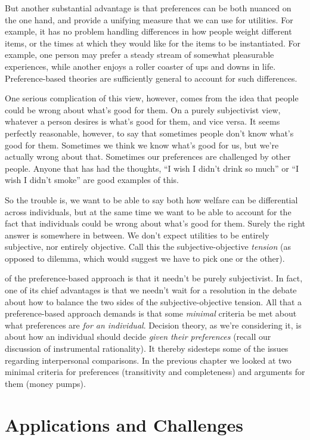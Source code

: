 \documentclass[]{tufte-book}
\begin{document}
But another substantial advantage is that preferences can be both nuanced on the one hand, and provide a unifying measure that we can use for utilities. For example, it has no problem handling differences in how people weight different items, or the times at which they would like for the items to be instantiated. For example, one person may prefer a steady stream of somewhat pleasurable experiences, while another enjoys a roller coaster of ups and downs in life. Preference-based theories are sufficiently general to account for such differences.

One serious complication of this view, however, comes from the idea that people could be wrong about what's good for them. On a purely subjectivist view, whatever a person desires is what's good for them, and vice versa. It seems perfectly reasonable, however, to say that sometimes people don't know what's good for them. Sometimes we think we know what's good for us, but we're actually wrong about that. Sometimes our preferences are challenged by other people. Anyone that has had the thoughts, ``I wish I didn't drink so much'' or ``I wish I didn't smoke'' are good examples of this.

So the trouble is, we want to be able to say both how welfare can be differential across individuals, but at the same time we want to be able to account for the fact that individuals could be wrong about what's good for them. Surely the right answer is somewhere in between. We don't expect utilities to be entirely subjective, nor entirely objective. Call this the subjective-objective \emph{tension} (as opposed to dilemma, which would suggest we have to pick one or the other).

 of the preference-based approach is that it needn't be purely subjectivist. In fact, one of its chief advantages is that we needn't wait for a resolution in the debate about how to balance the two sides of the subjective-objective tension. All that a preference-based approach demands is that some \emph{minimal} criteria be met about what preferences are \emph{for an individual}. Decision theory, as we're considering it, is about how an individual should decide \emph{given their preferences} (recall our discussion of instrumental rationality). It thereby sidesteps some of the issues regarding interpersonal comparisons. In the previous chapter we looked at two minimal criteria for preferences (transitivity and completeness) and arguments for them (money pumps).

\hypertarget{applications-and-challenges}{%
\section{Applications and Challenges}\label{applications-and-challenges}}
\end{document}
